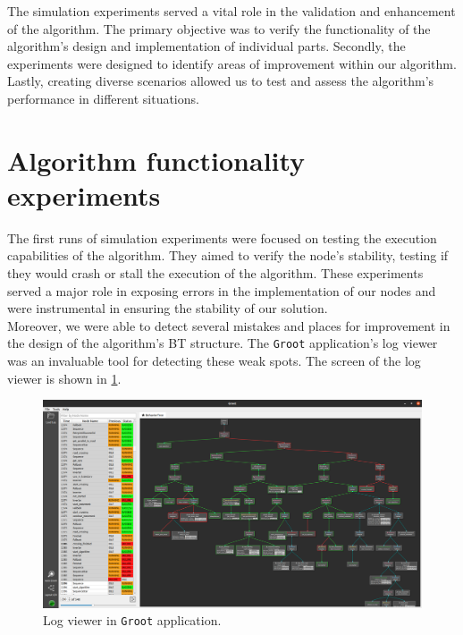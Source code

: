 The simulation experiments served a vital role in the validation and enhancement of the algorithm. The primary objective was to verify the functionality of the algorithm's design and implementation of individual parts. Secondly, the experiments were designed to identify areas of improvement within our algorithm. Lastly, creating diverse scenarios allowed us to test and assess the algorithm's performance in different situations.\\

\section{Algorithm functionality experiments}
    The first runs of simulation experiments were focused on testing the execution capabilities of the algorithm. They aimed to verify the node's stability, testing if they would crash or stall the execution of the algorithm. These experiments served a major role in exposing errors in the implementation of our nodes and were instrumental in ensuring the stability of our solution.\\
    Moreover, we were able to detect several mistakes and places for improvement in the design of the algorithm's BT structure. The \texttt{Groot} application's log viewer was an invaluable tool for detecting these weak spots. The screen of the log viewer is shown in \ref{fig:log_viewer}.\\
    \begin{figure}[ht]
        \centering
        \includegraphics[width=\linewidth]{images/log_viewer.png}
        \caption{Log viewer in \texttt{Groot} application.}
        \label{fig:log_viewer}
    \end{figure}

